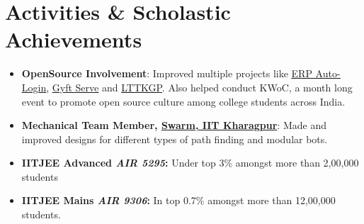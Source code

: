 \documentclass[letterpaper,11pt]{article}
\begin{document}
\section{Activities \& Scholastic Achievements}
\begin{itemize}[leftmargin=0.15in, label={}]
\item \textbf{OpenSource Involvement}: Improved multiple projects like {\href{https://github.com/metakgp/erp-auto-login} {\underline{ERP Auto-Login}}}, {\href {https://github.com/metakgp/gyft-serve}{\underline{Gyft Serve}}} and {\href{https://github.com/lttkgp}{\underline{LTTKGP}}}. Also helped conduct KWoC, a month long event to promote open source culture among college students across India.

\item\textbf{Mechanical Team Member, {\href{https://swarm-iitkgp.github.io/}{Swarm, IIT Kharagpur}}}: Made and improved designs for different types of path finding and modular bots.

\item\textbf{IITJEE Advanced \emph{AIR 5295}:} Under top 3\% amongst more than 2,00,000 students 
\item\textbf{IITJEE Mains \emph{AIR 9306}:} In top 0.7\% amongst more than 12,00,000 students. 

\end{itemize}


\end{document}

